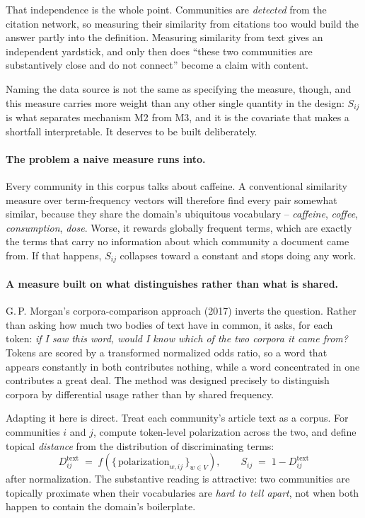 \documentclass[11pt]{article}
\begin{document}
That independence is the whole point. Communities are \emph{detected} from the citation
network, so measuring their similarity from citations too would build the answer partly
into the definition. Measuring similarity from text gives an independent yardstick, and
only then does ``these two communities are substantively close and do not connect'' become
a claim with content.

Naming the data source is not the same as specifying the measure, though, and this measure
carries more weight than any other single quantity in the design: $S_{ij}$ is what
separates mechanism M2 from M3, and it is the covariate that makes a shortfall
interpretable. It deserves to be built deliberately.

\paragraph{The problem a naive measure runs into.}
Every community in this corpus talks about caffeine. A conventional similarity measure over
term-frequency vectors will therefore find every pair somewhat similar, because they share
the domain's ubiquitous vocabulary -- \emph{caffeine}, \emph{coffee}, \emph{consumption},
\emph{dose}. Worse, it rewards globally frequent terms, which are exactly the terms that
carry no information about which community a document came from. If that happens, $S_{ij}$
collapses toward a constant and stops doing any work.

\paragraph{A measure built on what distinguishes rather than what is shared.}
G.\,P. Morgan's corpora-comparison approach (2017) inverts the question. Rather than asking
how much two bodies of text have in common, it asks, for each token: \emph{if I saw this
word, would I know which of the two corpora it came from?} Tokens are scored by a
transformed normalized odds ratio, so a word that appears constantly in both contributes
nothing, while a word concentrated in one contributes a great deal. The method was
designed precisely to distinguish corpora by differential usage rather than by shared
frequency.

Adapting it here is direct. Treat each community's article text as a corpus. For
communities $i$ and $j$, compute token-level polarization across the two, and define
topical \emph{distance} from the distribution of discriminating terms:
\[
D^{\text{text}}_{ij} \;=\; f\!\left(\{\,\text{polarization}_{w,ij}\,\}_{w \in V}\right),
\qquad
S_{ij} \;=\; 1 - D^{\text{text}}_{ij}
\]
after normalization. The substantive reading is attractive: two communities are topically
proximate when their vocabularies are \emph{hard to tell apart}, not when both happen to
contain the domain's boilerplate.
\end{document}
